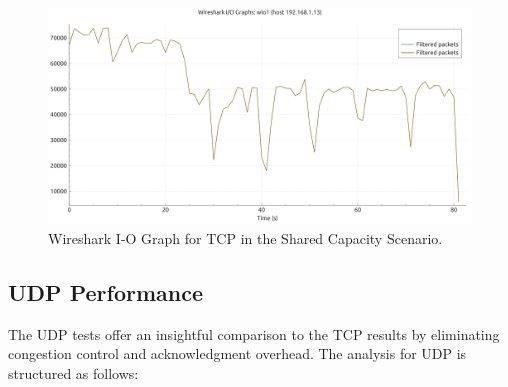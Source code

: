 \begin{enumerate}
                \begin{figure}[ht]
                    \centering
                    \includegraphics[width=0.9\columnwidth]{images/graphs/I-O/I-O_MIX_MITM_TCP.pdf}
                    \caption{Wireshark I-O Graph for TCP in the Shared Capacity Scenario.}
                    \label{fig:io-mitm-tcp}
                \end{figure}

        \end{enumerate}

    \subsection{UDP Performance} \label{subsec:udp-performance}

        The UDP tests offer an insightful comparison to the TCP results by eliminating congestion control and acknowledgment overhead. The analysis for UDP is structured as follows:

